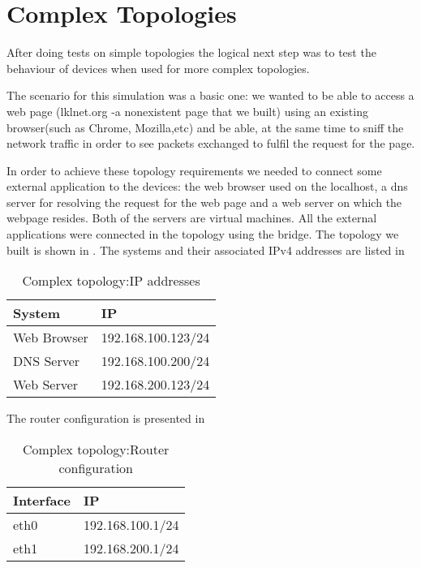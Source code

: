 \section{Complex Topologies}
\label{sec:complex-top}
After doing tests on simple topologies the logical next step was to test the behaviour of \project devices when used for more complex topologies. 

The scenario for this simulation was a basic one: we wanted to be able to access a web page (lklnet.org -a nonexistent page that we built) using an existing browser(such as Chrome, Mozilla,etc) and be able, at the same time to sniff the network traffic in order to see packets exchanged to fulfil the request for the page.

In order to achieve these topology requirements we needed to connect some external application to the \project devices: the web browser used on the localhost, a dns server for resolving the request for the web page and a web server on which the webpage resides. Both of the servers are virtual machines.
All the external applications were connected in the topology using the bridge.  
The topology we built is shown in .
The systems and their associated IPv4 addresses are listed in 
\begin{center}
  \begin{table}[htb]
  \begin{center}
  \begin{tabular}{| l | l |}
	\hline
	System & IP \\ \hline
	Web Browser & 192.168.100.123/24 \\ \hline
	DNS Server & 192.168.100.200/24 \\ \hline
	Web Server & 192.168.200.123/24 \\	 
    \hline
  \end{tabular}
  \end{center}
  \caption{Complex topology:IP addresses}
  \label{table:complex-ip}
  \end{table}
\end{center}
The router configuration is presented in 
\begin{center}
  \begin{table}[htb]
  \begin{center}
  \begin{tabular}{| l | l |}
	\hline
	Interface & IP \\ \hline
	eth0 & 192.168.100.1/24 \\ \hline
	eth1 & 192.168.200.1/24 \\	 
    \hline
  \end{tabular}
  \end{center}
  \caption{Complex topology:Router configuration}
  \label{table:complex-router}
  \end{table}
\end{center}
